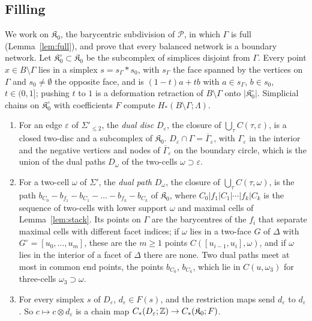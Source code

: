 \subsection{Filling}\label{ssec:filling}

We work on $\mathfrak K_0$, the barycentric subdivision of $\mathscr P$, in which $\Gamma$ is full
(Lemma~\ref{lem:full}), and prove that every balanced network is a boundary network. Let $\mathfrak K_0^\circ\subset\mathfrak K_0$ be the
subcomplex of simplices disjoint from $\Gamma$. Every point $x\in B\setminus\Gamma$ lies in a simplex $s=s_\Gamma*s_0$,
with $s_\Gamma$ the face spanned by the vertices on $\Gamma$ and $s_0\ne\emptyset$ the opposite face, and is
$(1-t)a+tb$ with $a\in s_\Gamma$, $b\in s_0$, $t\in(0,1]$; pushing $t$ to $1$ is a deformation retraction of
$B\setminus\Gamma$ onto $|\mathfrak K_0^\circ|$. Simplicial chains on $\mathfrak K_0^\circ$ with coefficients $F$ compute $H_*(B\setminus\Gamma;\Lambda)$.

\begin{lemma}\label{lem:dualdisc}
\begin{enumerate}
\item For an edge $\varepsilon$ of $\Sigma'_{\le2}$, the \emph{dual disc} $D_\varepsilon$, the closure of $\bigcup_\tau C(\tau,\varepsilon)$,
is a closed two-disc and a subcomplex of $\mathfrak K_0$. $D_\varepsilon\cap\Gamma=\overline\Gamma_\varepsilon$, with
$\Gamma_\varepsilon$ in the interior and the negative vertices and nodes of $\overline\Gamma_\varepsilon$ on the boundary
circle, which is the union of the dual paths $D_\omega$ of the two-cells $\omega\supset\varepsilon$.
\item For a two-cell $\omega$ of $\Sigma'$, the \emph{dual path} $D_\omega$, the closure of $\bigcup_\tau C(\tau,\omega)$,
is the path $b_{C_0}-b_{f_1}-b_{C_1}-\dots-b_{f_k}-b_{C_k}$ of $\mathfrak K_0$, where $C_0|f_1|C_1|\cdots|f_k|C_k$ is the
sequence of two-cells with lower support $\omega$ and maximal cells of Lemma~\ref{lem:stack}. Its points on $\Gamma$ are
the barycentres of the $f_i$ that separate maximal cells with different facet indices; if $\omega$ lies in a two-face
$G$ of $\Delta$ with $G^\circ=[u_0,\dots,u_m]$, these are the $m\ge1$ points $C([u_{i-1},u_i],\omega)$, and if $\omega$ lies
in the interior of a facet of $\Delta$ there are none. Two dual paths meet at most in common end points, the points
$b_{C_0}$, $b_{C_k}$, which lie in $C(u,\omega_3)$ for three-cells $\omega_3\supset\omega$.
\item For every simplex $s$ of $D_\varepsilon$, $d_\varepsilon\in F(s)$, and the restriction maps send $d_\varepsilon$ to
$d_\varepsilon$. So $c\mapsto c\otimes d_\varepsilon$ is a chain map $C_*(D_\varepsilon;\mathbb Z)\to C_*(\mathfrak K_0;F)$.
\end{enumerate}
\end{lemma}

